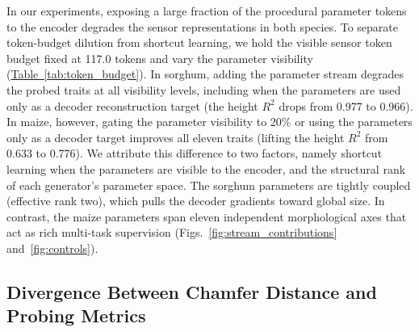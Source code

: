 \documentclass[10pt,twocolumn,letterpaper]{article}
\newcommand{\tabref}[1]{\hyperref[#1]{Table~\ref*{#1}}}
\begin{document}
In our experiments, exposing a large fraction of the procedural parameter tokens to the encoder degrades the sensor representations in both species. To separate token-budget dilution from shortcut learning, we hold the visible sensor token budget fixed at 117.0 tokens and vary the parameter visibility (\tabref{tab:token_budget}). In sorghum, adding the parameter stream degrades the probed traits at all visibility levels, including when the parameters are used only as a decoder reconstruction target (the height $R^2$ drops from 0.977 to 0.966). In maize, however, gating the parameter visibility to 20\% or using the parameters only as a decoder target improves all eleven traits (lifting the height $R^2$ from 0.633 to 0.776). We attribute this difference to two factors, namely shortcut learning when the parameters are visible to the encoder, and the structural rank of each generator's parameter space. The sorghum parameters are tightly coupled (effective rank two), which pulls the decoder gradients toward global size. In contrast, the maize parameters span eleven independent morphological axes that act as rich multi-task supervision (\textcolor{cvprblue}{Figs.}~\ref{fig:stream_contributions} and~\ref{fig:controls}).

\subsection{Divergence Between Chamfer Distance and Probing Metrics}
\label{sec:res-metrics}\label{sec:exp-metrics}
\end{document}
